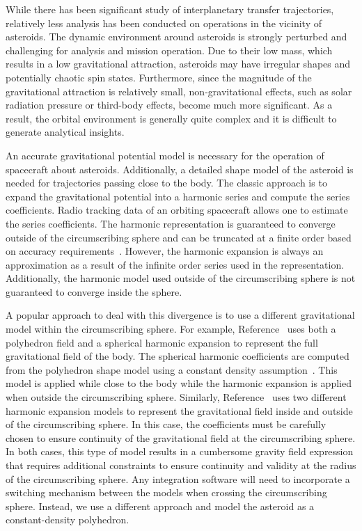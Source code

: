 \documentclass[]{aiaa-tc}%
\begin{document}
While there has been significant study of interplanetary transfer trajectories, relatively less analysis has been conducted on operations in the vicinity of asteroids.
The dynamic environment around asteroids is strongly perturbed and challenging for analysis and mission operation.
Due to their low mass, which results in a low gravitational attraction, asteroids may have irregular shapes and potentially chaotic spin states.
Furthermore, since the magnitude of the gravitational attraction is relatively small, non-gravitational effects, such as solar radiation pressure or third-body effects, become much more significant.
As a result, the orbital environment is generally quite complex and it is difficult to generate analytical insights.

An accurate gravitational potential model is necessary for the operation of spacecraft about asteroids.
Additionally, a detailed shape model of the asteroid is needed for trajectories passing close to the body.
The classic approach is to expand the gravitational potential into a harmonic series and compute the series coefficients.
Radio tracking data of an orbiting spacecraft allows one to estimate the series coefficients.
The harmonic representation is guaranteed to converge outside of the circumscribing sphere and can be truncated at a finite order based on accuracy requirements~\cite{scheeres2012a}.
However, the harmonic expansion is always an approximation as a result of the infinite order series used in the representation.
Additionally, the harmonic model used outside of the circumscribing sphere is not guaranteed to converge inside the sphere.

A popular approach to deal with this divergence is to use a different gravitational model within the circumscribing sphere.
For example, Reference~ uses both a polyhedron field and a spherical harmonic expansion to represent the full gravitational field of the body.
The spherical harmonic coefficients are computed from the polyhedron shape model using a constant density assumption~\cite{werner1997}.
This model is applied while close to the body while the harmonic expansion is applied when outside the circumscribing sphere.
Similarly, Reference~ uses two different harmonic expansion models to represent the gravitational field inside and outside of the circumscribing sphere.
In this case, the coefficients must be carefully chosen to ensure continuity of the gravitational field at the circumscribing sphere.
In both cases, this type of model results in a cumbersome gravity field expression that requires additional constraints to ensure continuity and validity at the radius of the circumscribing sphere.
Any integration software will need to incorporate a switching mechanism between the models when crossing the circumscribing sphere.
Instead, we use a different approach and model the asteroid as a constant-density polyhedron.
\end{document}
